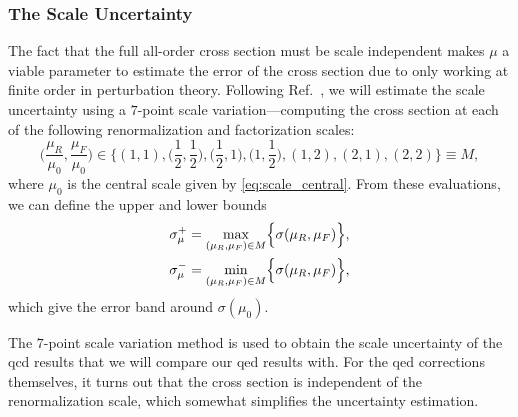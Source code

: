 \subsubsection{The Scale Uncertainty}
The fact that the full all-order cross section must be scale independent makes $\mu$ a viable parameter to estimate the error of the cross section due to only working at finite order in perturbation theory.
Following Ref.~\cite{Braseth:2025ylj}, we will estimate the scale uncertainty using a $7$-point scale variation---computing the cross section at each of the following renormalization and factorization scales:
\begin{equation}
    \biggl( \frac{\mu_R}{\mu_0}, \frac{\mu_F}{\mu_0}\biggr) \in \biggl\{
        (1,1), \biggl(\frac{1}{2},\frac{1}{2}\biggr), \biggl(\frac{1}{2},1\biggr), \biggl(1, \frac{1}{2}\biggr), (1,2), (2,1), (2,2)
    \biggr\} \equiv M,
\end{equation}
where $\mu_0$ is the central scale given by \cref{eq:scale_central}. From these evaluations, we can define the upper and lower bounds
\begin{subequations}
\begin{align}
    \sigma_\mu^+ &= \max_{(\mu_R,\mu_F) \in M} \Bigl\{ \sigma(\mu_R, \mu_F) \Bigr\},
    \\
    \sigma_\mu^- &= \min_{(\mu_R,\mu_F) \in M} \Bigl\{ \sigma(\mu_R, \mu_F) \Bigr\},
\end{align}
\end{subequations}
which give the error band around $\sigma(\mu_0)$.

The $7$-point scale variation method is used to obtain the scale uncertainty of the \gls{qcd} results that we will compare our \gls{qed} results with.
For the \gls{qed} corrections themselves, it turns out that the cross section is independent of the renormalization scale, which somewhat simplifies the uncertainty estimation.

